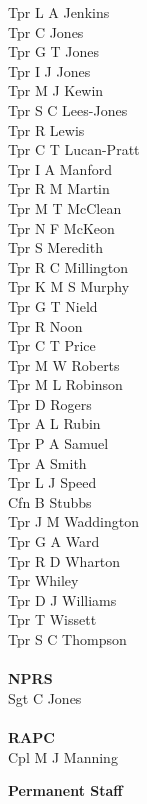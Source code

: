 \begin{multicols}{2}
  Tpr L A Jenkins \\
  Tpr C Jones \\
  Tpr G T Jones \\
  Tpr I J Jones \\
  Tpr M J Kewin \\
  Tpr S C Lees-Jones \\
  Tpr R Lewis \\
  Tpr C T Lucan-Pratt \\
  Tpr I A Manford \\
  Tpr R M Martin \\
  Tpr M T McClean \\
  Tpr N F McKeon \\
  Tpr S Meredith \\
  Tpr R C Millington \\
  Tpr K M S Murphy \\
  Tpr G T Nield \\
  Tpr R Noon \\
  Tpr C T Price \\
  Tpr M W Roberts \\
  Tpr M L Robinson \\
  Tpr D Rogers \\
  Tpr A L Rubin \\
  Tpr P A Samuel \\
  Tpr A Smith \\
  Tpr L J Speed \\
  Cfn B Stubbs \\
  Tpr J M Waddington \\
  Tpr G A Ward \\
  Tpr R D Wharton \\
  Tpr Whiley \\
  Tpr D J Williams \\
  Tpr T Wissett \\
  Tpr S C Thompson \\
  \\
  \textbf{NPRS} \\
  Sgt C Jones \\
  \\
  \textbf{RAPC} \\
  Cpl M J Manning \\
\end{multicols}

\begin{center}
  \Large
  \textbf{Permanent Staff}
\end{center}

